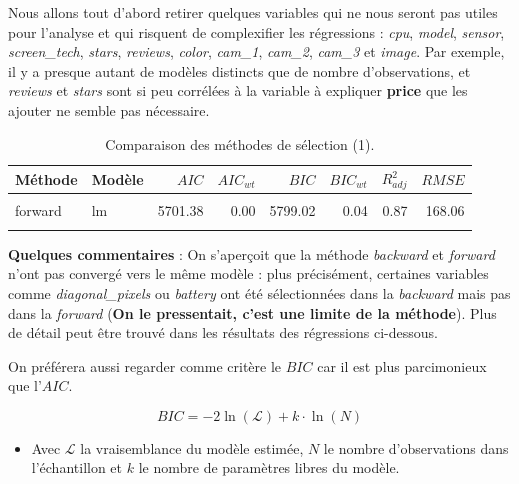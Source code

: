 \documentclass[
  12pt,
]{report}
\providecommand{\tightlist}{%
  \setlength{\itemsep}{0pt}\setlength{\parskip}{0pt}}\usepackage{longtable,booktabs,array}
\begin{document}
Nous allons tout d'abord retirer quelques variables qui ne nous seront
pas utiles pour l'analyse et qui risquent de complexifier les
régressions : \emph{cpu}, \emph{model}, \emph{sensor},
\emph{screen\_tech}, \emph{stars}, \emph{reviews}, \emph{color},
\emph{cam\_1}, \emph{cam\_2}, \emph{cam\_3} et \emph{image}. Par
exemple, il y a presque autant de modèles distincts que de nombre
d'observations, et \emph{reviews} et \emph{stars} sont si peu corrélées
à la variable à expliquer \textbf{price} que les ajouter ne semble pas
nécessaire.

\begin{table}[!h]
\centering
\caption{\label{tab:kable_perf}Comparaison des méthodes de sélection (1).}
\centering
\begin{tabular}[t]{llrrrrrr}
\toprule
\textbf{Méthode} & \textbf{Modèle} & \textbf{$AIC$} & \textbf{$AIC_{wt}$} & \textbf{$BIC$} & \textbf{$BIC_{wt}$} & \textbf{$R^2_{adj}$} & \textbf{$RMSE$}\\
\midrule
\cellcolor{gray!10}{backward} & \cellcolor{gray!10}{lm} & \cellcolor{gray!10}{5690.77} & \cellcolor{gray!10}{0.89} & \cellcolor{gray!10}{5800.62} & \cellcolor{gray!10}{0.02} & \cellcolor{gray!10}{0.88} & \cellcolor{gray!10}{164.86}\\
forward & lm & 5701.38 & 0.00 & 5799.02 & 0.04 & 0.87 & 168.06\\
\cellcolor{gray!10}{genetic} & \cellcolor{gray!10}{lm} & \cellcolor{gray!10}{5694.93} & \cellcolor{gray!10}{0.11} & \cellcolor{gray!10}{5792.57} & \cellcolor{gray!10}{0.95} & \cellcolor{gray!10}{0.87} & \cellcolor{gray!10}{166.81}\\
\bottomrule
\end{tabular}
\end{table}

\textbf{Quelques commentaires} : On s'aperçoit que la méthode
\emph{backward} et \emph{forward} n'ont pas convergé vers le même modèle
: plus précisément, certaines variables comme \emph{diagonal\_pixels} ou
\emph{battery} ont été sélectionnées dans la \emph{backward} mais pas
dans la \emph{forward} (\textbf{On le pressentait, c'est une limite de
la méthode}). Plus de détail peut être trouvé dans les résultats des
régressions ci-dessous.

On préférera aussi regarder comme critère le \(BIC\) car il est plus
parcimonieux que l'\(AIC\).

\[ BIC = -2\ln(\mathcal{L}) + k \cdot \ln(N) \]

\begin{itemize}
\tightlist
\item
  Avec \(\mathcal{L}\) la vraisemblance du modèle estimée, \(N\) le
  nombre d'observations dans l'échantillon et \(k\) le nombre de
  paramètres libres du modèle.
\end{itemize}
\end{document}
